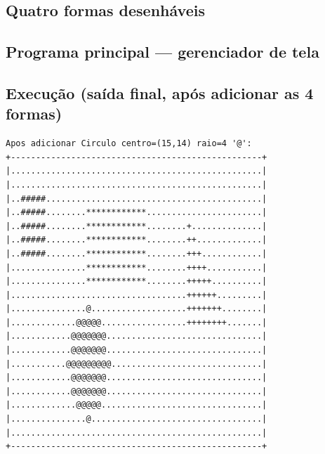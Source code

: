 \documentclass[11pt,a4paper]{article}
\begin{document}



\subsection*{Quatro formas desenh\'aveis}













\subsection*{Programa principal --- gerenciador de tela}



\subsection*{Execu\c{c}\~ao (sa\'ida final, ap\'os adicionar as 4 formas)}

\begin{saidabox}
\begin{lstlisting}[style=terminal]
Apos adicionar Circulo centro=(15,14) raio=4 '@':
+--------------------------------------------------+
|..................................................|
|..................................................|
|..#####...........................................|
|..#####........************.......................|
|..#####........************........+..............|
|..#####........************........++.............|
|..#####........************........+++............|
|...............************........++++...........|
|...............************........+++++..........|
|...................................++++++.........|
|...............@...................+++++++........|
|.............@@@@@.................++++++++.......|
|............@@@@@@@...............................|
|............@@@@@@@...............................|
|...........@@@@@@@@@..............................|
|............@@@@@@@...............................|
|............@@@@@@@...............................|
|.............@@@@@................................|
|...............@..................................|
|..................................................|
+--------------------------------------------------+
\end{lstlisting}
\end{saidabox}
\end{document}
